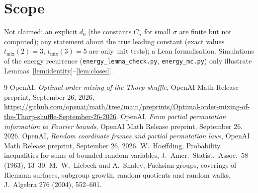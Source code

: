 \documentclass[11pt]{amsart}
\theoremstyle{remark}
\begin{document}
\section{Scope}
Not claimed: an explicit $d_0$ (the constants $C_\sigma$ for small $\sigma$ are finite but
not computed); any statement about the true leading constant (exact values $t_{\mathrm{mix}}(2)=3$,
$t_{\mathrm{mix}}(3)=5$ are only unit tests); a Lean formalisation. Simulations of the energy recurrence
(\texttt{energy\_lemma\_check.py}, \texttt{energy\_mc.py}) only illustrate Lemmas~\ref{lem:identity}--\ref{lem:closed}.

\begin{thebibliography}{9}
 OpenAI, \emph{Optimal-order mixing of the Thorp shuffle}, OpenAI Math Release preprint,
September 26, 2026, \url{https://github.com/openai/math/tree/main/preprints/Optimal-order-mixing-of-the-Thorp-shuffle-September-26-2026}.
 OpenAI, \emph{From partial permutation information to Fourier bounds}, OpenAI Math
Release preprint, September 26, 2026.
 OpenAI, \emph{Random coordinate frames and partial permutation laws}, OpenAI Math
Release preprint, September 26, 2026.
 W.~Hoeffding, Probability inequalities for sums of bounded random variables,
J.~Amer.\ Statist.\ Assoc.\ 58 (1963), 13--30.
 M.~W.~Liebeck and A.~Shalev, Fuchsian groups, coverings of Riemann surfaces,
subgroup growth, random quotients and random walks, J.~Algebra 276 (2004), 552--601.
\end{thebibliography}
\end{document}
